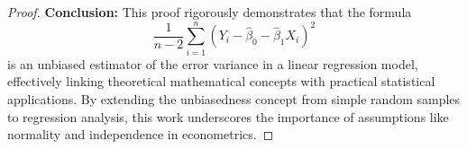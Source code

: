 \documentclass[12pt]{amsart}
\theoremstyle{definition}
\numberwithin{equation}{section}
\theoremstyle{plain}
\begin{document}
\begin{proof}
\textbf{\large Conclusion:} This proof rigorously demonstrates that the formula 
\[
\frac{1}{n-2}\sum_{i=1}^n(Y_i-\widehat{\beta}_0 - \widehat{\beta}_1X_i)^2
\]
is an unbiased estimator of the error variance in a linear regression model, effectively linking theoretical mathematical concepts with practical statistical applications. 
By extending the unbiasedness concept from simple random samples to regression analysis, this work underscores the importance of assumptions like normality and independence in econometrics. 
\end{proof}
\end{document}
